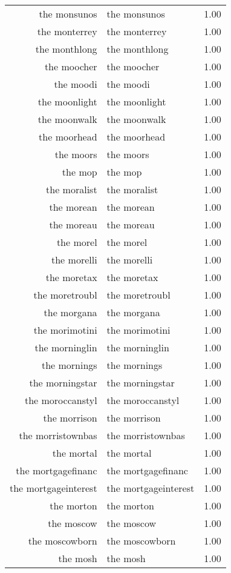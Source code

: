 \begin{table}[ht]
\begin{tabular}{rlr}
  the monsunos & the monsunos & 1.00 \\ 
  the monterrey & the monterrey & 1.00 \\ 
  the monthlong & the monthlong & 1.00 \\ 
  the moocher & the moocher & 1.00 \\ 
  the moodi & the moodi & 1.00 \\ 
  the moonlight & the moonlight & 1.00 \\ 
  the moonwalk & the moonwalk & 1.00 \\ 
  the moorhead & the moorhead & 1.00 \\ 
  the moors & the moors & 1.00 \\ 
  the mop & the mop & 1.00 \\ 
  the moralist & the moralist & 1.00 \\ 
  the morean & the morean & 1.00 \\ 
  the moreau & the moreau & 1.00 \\ 
  the morel & the morel & 1.00 \\ 
  the morelli & the morelli & 1.00 \\ 
  the moretax & the moretax & 1.00 \\ 
  the moretroubl & the moretroubl & 1.00 \\ 
  the morgana & the morgana & 1.00 \\ 
  the morimotini & the morimotini & 1.00 \\ 
  the morninglin & the morninglin & 1.00 \\ 
  the mornings & the mornings & 1.00 \\ 
  the morningstar & the morningstar & 1.00 \\ 
  the moroccanstyl & the moroccanstyl & 1.00 \\ 
  the morrison & the morrison & 1.00 \\ 
  the morristownbas & the morristownbas & 1.00 \\ 
  the mortal & the mortal & 1.00 \\ 
  the mortgagefinanc & the mortgagefinanc & 1.00 \\ 
  the mortgageinterest & the mortgageinterest & 1.00 \\ 
  the morton & the morton & 1.00 \\ 
  the moscow & the moscow & 1.00 \\ 
  the moscowborn & the moscowborn & 1.00 \\ 
  the mosh & the mosh & 1.00 \\ 

\end{tabular}
\end{table}
